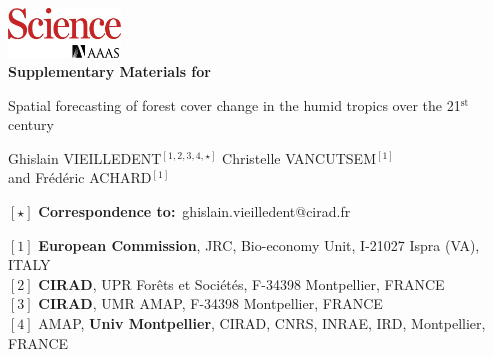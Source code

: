 \renewcommand{\bibsection}{}  %

\begin{center}
  \includegraphics[width=3cm]{figures/Science_logo.png}\\
  \vspace{0.5cm}
  \Large{\textbf{Supplementary Materials for}}
\end{center}

\vspace{1cm}

\begin{center}
  \LARGE{Spatial forecasting of forest cover change in the humid tropics over the 21$^{\text{st}}$ century}
\end{center}

\vspace{1cm}

\begin{center}
  \large{
  Ghislain VIEILLEDENT$^{[1, 2, 3, 4, \star]}$ \hspace{0.5cm} Christelle VANCUTSEM$^{[1]}$\\
  \vspace{0.5cm}
  and \hspace{0.5cm} Frédéric ACHARD$^{[1]}$
  }
\end{center}

\vspace{0.5cm}

\begin{center}
  $[\star]$ \textbf{Correspondence to:}~ghislain.vieilledent@cirad.fr\\
\end{center}

\vspace{0.5cm}

{\small
  \begin{flushleft}
    $[1]$ \textbf{European Commission}, JRC, Bio-economy Unit, I-21027 Ispra (VA), ITALY\\
    $[2]$ \textbf{CIRAD}, UPR Forêts et Sociétés, F-34398 Montpellier, FRANCE\\
    $[3]$ \textbf{CIRAD}, UMR AMAP, F-34398 Montpellier, FRANCE\\
    $[4]$ AMAP, \textbf{Univ Montpellier}, CIRAD, CNRS, INRAE, IRD, Montpellier, FRANCE\\
  \end{flushleft}}

\vspace{1cm}
